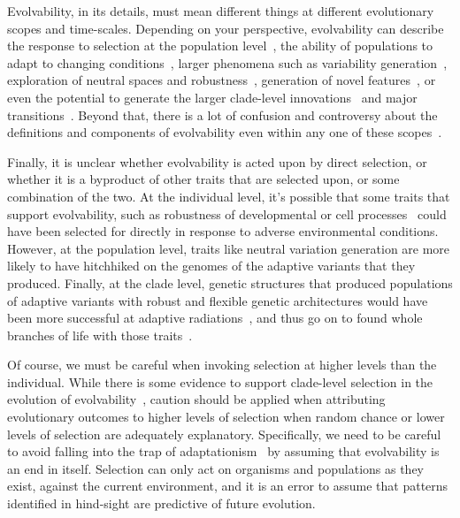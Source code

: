 \documentclass[PhD]{msu-thesis}
\begin{document}
Evolvability, in its details, must mean different things at different evolutionary scopes and time-scales. 
Depending on your perspective, evolvability can describe the response to selection at the population level~\cite{fisher_genetical_1930,houle_comparing_1992}, the ability of populations to adapt to changing conditions~\cite{belle_code_2002}, 
larger phenomena such as variability generation~\cite{gunter_p._wagner_perspective:_1996}, 
exploration of neutral spaces and robustness~\cite{andreas_wagner_robustness_2005,kitano_biological_2004}, 
generation of novel features~\cite{alberch_genes_1991,brookfield_evolution:_2001}, 
or even the potential to generate the larger clade-level innovations~\cite{kirschner_evolvability_1998} 
and major transitions~\cite{smith_major_1995}. 
Beyond that, there is a lot of confusion and controversy about the definitions and components of evolvability even within any one of these scopes~\cite{pigliucci_is_2008}.

Finally, it is unclear whether evolvability is acted upon by direct selection, or whether it is a byproduct of other traits that are selected upon, or some combination of the two. At the individual level, it’s possible that some traits that support evolvability, such as robustness of developmental or cell processes~\cite{kirschner_evolvability_1998} could have been selected for directly in response to adverse environmental conditions. However, at the population level, traits like neutral variation generation are more likely to have hitchhiked on the genomes of the adaptive variants that they produced. Finally, at the clade level, genetic structures that produced populations of adaptive variants with robust and flexible genetic architectures would have been more successful at adaptive radiations~\cite{dawkins_13_2003}, and thus go on to found whole branches of life with those traits~\cite{kirschner_evolvability_1998}. 

Of course, we must be careful when invoking selection at higher levels than the individual. While there is some evidence to support clade-level selection in the evolution of evolvability~\cite{okasha_evolution_2006}, caution should be applied when attributing evolutionary outcomes to higher levels of selection when random chance or lower levels of selection are adequately explanatory. Specifically, we need to be careful to avoid falling into the trap of adaptationism~\cite{gould_spandrels_1979} by assuming that evolvability is an end in itself. Selection can only act on organisms and populations as they exist, against the current environment, and it is an error to assume that patterns identified in hind-sight are predictive of future evolution.
\end{document}
